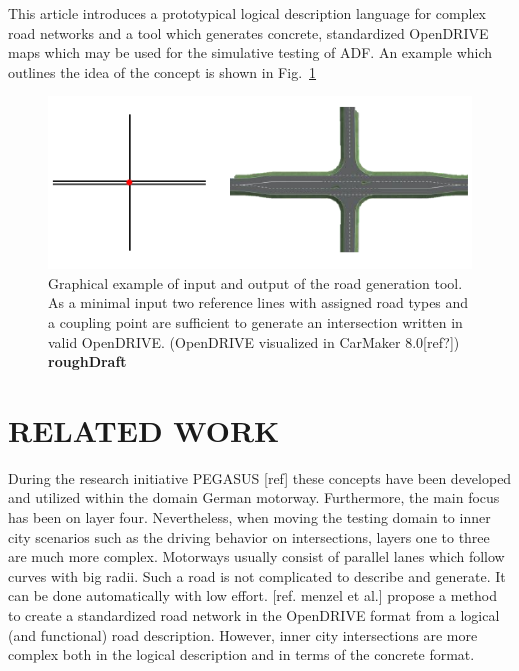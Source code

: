 \documentclass[a4paper, 10pt, conference]{ieeeconf}      %
\begin{document}
This article introduces a prototypical logical description language for complex road networks and a tool which generates concrete, standardized OpenDRIVE maps which may be used for the simulative testing of ADF. An example which outlines the idea of the concept is shown in Fig.~\ref{fig_motivation}

\begin{figure}[tpb] 		
	\centering
	\includegraphics{fig/motivation.pdf}
	\caption{Graphical example of input and output of the road generation tool. As a minimal input two reference lines with assigned road types and a coupling point are sufficient to generate an intersection written in valid OpenDRIVE. (OpenDRIVE visualized in CarMaker 8.0[ref?]) \textbf{roughDraft}}
	\label{fig_motivation}
\end{figure}
\section{RELATED WORK}
During the research initiative PEGASUS [ref] these concepts have been developed and utilized within the domain German motorway. Furthermore, the main focus has been on layer four. Nevertheless, when moving the testing domain to inner city scenarios such as the driving behavior on intersections, layers one to three are much more complex. Motorways usually consist of parallel lanes which follow curves with big radii. Such a road is not complicated to describe and generate. It can be done automatically with low effort. [ref. menzel et al.] propose a method to create a standardized road network in the OpenDRIVE format from a logical (and functional) road description. However, inner city intersections are more complex both in the logical description and in terms of the concrete format. 
\end{document}
